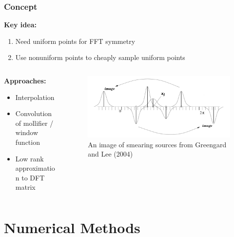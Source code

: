 \documentclass{beamer}
\begin{document}
\begin{frame}
  \frametitle{Concept}
  \textbf{Key idea:}
  \begin{enumerate}
      \item Need uniform points for FFT symmetry
      \item Use nonuniform points to cheaply sample uniform points
  \end{enumerate}

  \vfill

  \begin{columns}
      \begin{column}{.5\textwidth}
        \textbf{Approaches:}
        \begin{itemize}
            \item Interpolation
            \item Convolution of mollifier / window function
            \item Low rank approximation to DFT matrix
        \end{itemize}
      \end{column}
      \begin{column}{.5\textwidth}
        \begin{figure}
          \centering
          \includegraphics[width=\textwidth]{images/sample_gaussian.png}
          \caption{An image of smearing sources from 
            Greengard and Lee (2004) \cite{SIAM-Rev-2004-Greengard}}
        \end{figure}
      \end{column}
  \end{columns}
\end{frame}


\section{Numerical Methods}
\begin{frame}
    \sectionpage
\end{frame}
\end{document}
